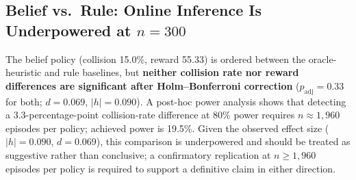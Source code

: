 \subsection[Belief vs.\ Rule: Online Inference Is Underpowered at n=300]{Belief vs.\ Rule: Online Inference Is Underpowered at $n{=}300$}
\label{sec:results_belief}
The belief policy (collision 15.0\%, reward 55.33) is ordered between the
oracle-heuristic and rule baselines, but \textbf{neither collision rate nor
reward differences are significant after Holm--Bonferroni correction}
($p_\text{adj}{=}0.33$ for both; $d{=}0.069$, $|h|{=}0.090$).
A post-hoc power analysis shows that detecting a 3.3-percentage-point
collision-rate difference at 80\% power requires $n{\approx}1{,}960$
episodes per policy; achieved power is 19.5\%.
Given the observed effect size ($|h|{=}0.090$, $d{=}0.069$), this comparison
is underpowered and should be treated as suggestive rather than conclusive; a
confirmatory replication at $n{\geq}1{,}960$ episodes per policy is required
to support a definitive claim in either direction.

